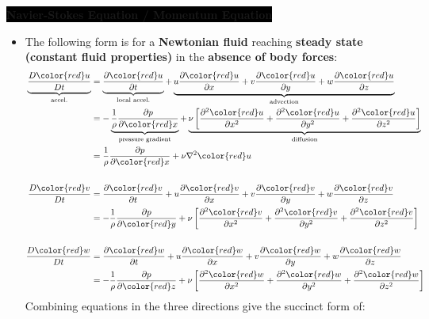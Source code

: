 \colorbox{black}{\textbf{\color{white}Navier-Stokes Equation / Momentum Equation}}
\begin{itemize}
    \item The following form is for a \textbf{\color{red}Newtonian fluid} reaching \textbf{\color{orange}steady state (constant fluid properties)} in the \textbf{\color{teal}absence of body forces}:
    \begin{align*}
        \underbrace{\frac{D{\color{red}u}}{Dt}}_{\text{accel.}} &= \underbrace{\frac{\partial {\color{red}u}}{\partial t}}_{\text{local accel.}} + \underbrace{u \frac{\partial {\color{red}u}}{\partial x} + v \frac{\partial {\color{red}u}}{\partial y} + w \frac{\partial {\color{red}u}}{\partial z}}_{\text{advection}} \\
        &= - \underbrace{\frac{1}{\rho}\frac{\partial p}{\partial {\color{red}x}}}_{\text{pressure gradient}} + \underbrace{\nu \left[ \frac{\partial^2 {\color{red}u}}{\partial x^2} + \frac{\partial^2 {\color{red}u}}{\partial y^2} + \frac{\partial^2 {\color{red}u}}{\partial z^2} \right]}_{\text{diffusion}} \\
        &= \frac{1}{\rho}\frac{\partial p}{\partial {\color{red}x}} + \nu \nabla^2 {\color{red}u} \\
        \\
        \frac{D{\color{red}v}}{Dt} &= \frac{\partial {\color{red}v}}{\partial t} + u \frac{\partial {\color{red}v}}{\partial x} + v \frac{\partial {\color{red}v}}{\partial y} + w \frac{\partial {\color{red}v}}{\partial z} \\
        &= - \frac{1}{\rho}\frac{\partial p}{\partial {\color{red}y}} + \nu \left[ \frac{\partial^2 {\color{red}v}}{\partial x^2} + \frac{\partial^2 {\color{red}v}}{\partial y^2} + \frac{\partial^2 {\color{red}v}}{\partial z^2} \right]\\
        \\
        \frac{D{\color{red}w}}{Dt} &= \frac{\partial {\color{red}w}}{\partial t} + u \frac{\partial {\color{red}w}}{\partial x} + v \frac{\partial {\color{red}w}}{\partial y} + w \frac{\partial {\color{red}w}}{\partial z} \\
        &= - \frac{1}{\rho}\frac{\partial p}{\partial {\color{red}z}} + \nu \left[ \frac{\partial^2 {\color{red}w}}{\partial x^2} + \frac{\partial^2 {\color{red}w}}{\partial y^2} + \frac{\partial^2 {\color{red}w}}{\partial z^2} \right]
    \end{align*}
    Combining equations in the three directions give the succinct form of:
    \begin{align*}

\end{align*}
\end{itemize}
